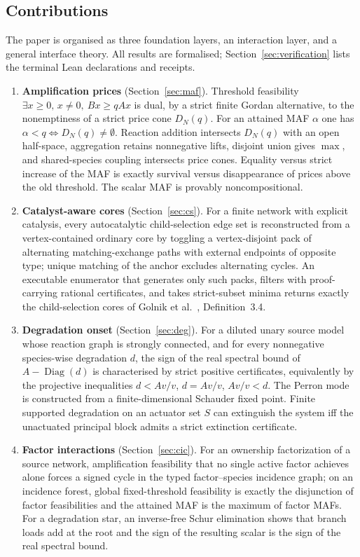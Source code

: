 \documentclass[11pt,a4paper]{article}
\theoremstyle{plain}
\theoremstyle{definition}
\theoremstyle{remark}
\newcommand{\Diag}{\operatorname{Diag}}
\begin{document}
\subsection{Contributions}

The paper is organised as three foundation layers, an interaction layer, and a general interface theory. All results are formalised; Section~\ref{sec:verification} lists the terminal Lean declarations and receipts.

\begin{enumerate}[label=\textbf{(\Roman*)}]
\item \textbf{Amplification prices} (Section~\ref{sec:maf}). Threshold feasibility $\exists x\ge 0,\,x\ne 0,\ Bx\ge qAx$ is dual, by a strict finite Gordan alternative, to the nonemptiness of a strict price cone $D_N(q)$. For an attained MAF $\alpha$ one has $\alpha<q\iff D_N(q)\neq\emptyset$. Reaction addition intersects $D_N(q)$ with an open half-space, aggregation retains nonnegative lifts, disjoint union gives $\max$, and shared-species coupling intersects price cones. Equality versus strict increase of the MAF is exactly survival versus disappearance of prices above the old threshold. The scalar MAF is provably noncompositional.
\item \textbf{Catalyst-aware cores} (Section~\ref{sec:cs}). For a finite network with explicit catalysis, every autocatalytic child-selection edge set is reconstructed from a vertex-contained ordinary core by toggling a vertex-disjoint pack of alternating matching-exchange paths with external endpoints of opposite type; unique matching of the anchor excludes alternating cycles. An executable enumerator that generates only such packs, filters with proof-carrying rational certificates, and takes strict-subset minima returns exactly the child-selection cores of Golnik et al.~\cite{golnik2026cores}, Definition~3.4.
\item \textbf{Degradation onset} (Section~\ref{sec:deg}). For a diluted unary source model whose reaction graph is strongly connected, and for every nonnegative species-wise degradation $d$, the sign of the real spectral bound of $A-\Diag(d)$ is characterised by strict positive certificates, equivalently by the projective inequalities $d< Av/v$, $d=Av/v$, $Av/v<d$. The Perron mode is constructed from a finite-dimensional Schauder fixed point. Finite supported degradation on an actuator set $S$ can extinguish the system iff the unactuated principal block admits a strict extinction certificate.
\item \textbf{Factor interactions} (Section~\ref{sec:cic}). For an ownership factorization of a source network, amplification feasibility that no single active factor achieves alone forces a signed cycle in the typed factor--species incidence graph; on an incidence forest, global fixed-threshold feasibility is exactly the disjunction of factor feasibilities and the attained MAF is the maximum of factor MAFs. For a degradation star, an inverse-free Schur elimination shows that branch loads add at the root and the sign of the resulting scalar is the sign of the real spectral bound.

\end{enumerate}
\end{document}
